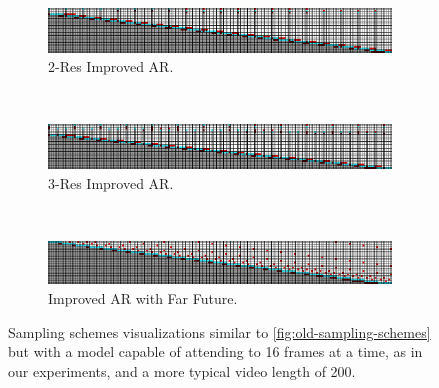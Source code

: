 \begin{figure}[t!]
\begin{subfigure}[t]{\textwidth}
    \end{subfigure}
    ~
    \begin{subfigure}[t]{\textwidth}
        \centering
        \includegraphics[width=\textwidth]{figures/big-sampling-scheme-visualizations/autoregressive-multires-10-1.png}
        \caption{2-Res Improved AR.}
        \label{fig:2res-app}
    \end{subfigure}
    ~
    \begin{subfigure}[t]{\textwidth}
        \centering
        \includegraphics[width=\textwidth]{figures/big-sampling-scheme-visualizations/autoregressive-multires-15-5-1.png}
        \caption{3-Res Improved AR.}
        \label{fig:3res-app}
    \end{subfigure}
    ~
    \begin{subfigure}[t]{\textwidth}
        \centering
        \includegraphics[width=\textwidth]{figures/big-sampling-scheme-visualizations/autoregressive-with-future.png}
        \caption{Improved AR with Far Future.}
    \end{subfigure}
    \caption{Sampling schemes visualizations similar to \cref{fig:old-sampling-schemes} but with a model capable of attending to 16 frames at a time, as in our experiments, and a more typical video length of 200.
    }
    \label{fig:sampling-scheme-details}
\end{figure}